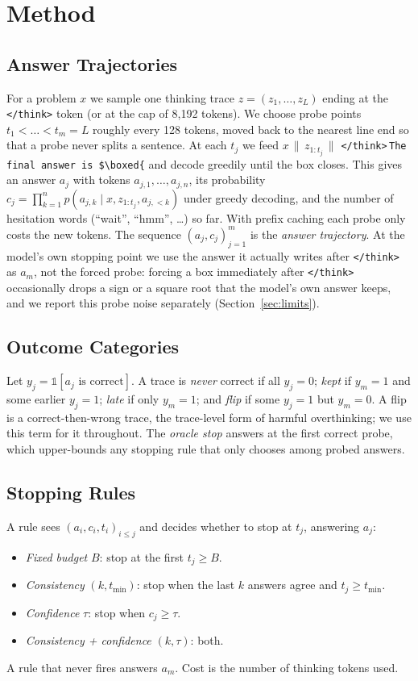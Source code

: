 \documentclass[conference]{IEEEtran}
\begin{document}
\section{Method}
\label{sec:method}
\subsection{Answer Trajectories}
For a problem $x$ we sample one thinking trace $z = (z_1,\dots,z_L)$ ending at the \texttt{</think>} token (or at the
cap of 8{,}192 tokens). We choose probe points $t_1<\dots<t_m=L$ roughly every 128 tokens, moved back to the nearest
line end so that a probe never splits a sentence. At each $t_j$ we feed
$x \,\|\, z_{1:t_j} \,\|$ \texttt{</think>}\,\texttt{The final answer is \$\textbackslash boxed\{} and decode greedily
until the box closes. This gives an answer $a_j$ with tokens $a_{j,1},\dots,a_{j,n}$, its probability $c_j=\prod_{k=1}^{n} p(a_{j,k}\mid x, z_{1:t_j}, a_{j,<k})$ under greedy decoding, and the number of
hesitation words (``wait'', ``hmm'', \dots) so far. With prefix caching \cite{vllm} each probe only costs the new
tokens. The sequence $(a_j, c_j)_{j=1}^m$ is the \emph{answer trajectory}. At the model's own stopping point we use the
answer it actually writes after \texttt{</think>} as $a_m$, not the forced probe: forcing a box immediately after
\texttt{</think>} occasionally drops a sign or a square root that the model's own answer keeps, and we report this
probe noise separately (Section~\ref{sec:limits}).

\subsection{Outcome Categories}
Let $y_j=\mathbb{1}[a_j \text{ is correct}]$. A trace is \emph{never} correct if all $y_j=0$; \emph{kept} if $y_m=1$ and
some earlier $y_j=1$; \emph{late} if only $y_m=1$; and \emph{flip} if some
$y_j=1$ but $y_m=0$. A flip is a correct-then-wrong trace, the trace-level form of harmful overthinking; we use this
term for it throughout. The \emph{oracle stop} answers at the first correct probe, which upper-bounds any stopping rule
that only chooses among probed answers.

\subsection{Stopping Rules}
A rule sees $(a_i,c_i,t_i)_{i\le j}$ and decides whether to stop at $t_j$, answering $a_j$:
\begin{itemize}
\item \emph{Fixed budget} $B$: stop at the first $t_j\ge B$.
\item \emph{Consistency} $(k, t_{\min})$: stop when the last $k$ answers agree and $t_j\ge t_{\min}$.
\item \emph{Confidence} $\tau$: stop when $c_j\ge\tau$.
\item \emph{Consistency + confidence} $(k,\tau)$: both.
\end{itemize}
A rule that never fires answers $a_m$. Cost is the number of thinking tokens used.
\end{document}
